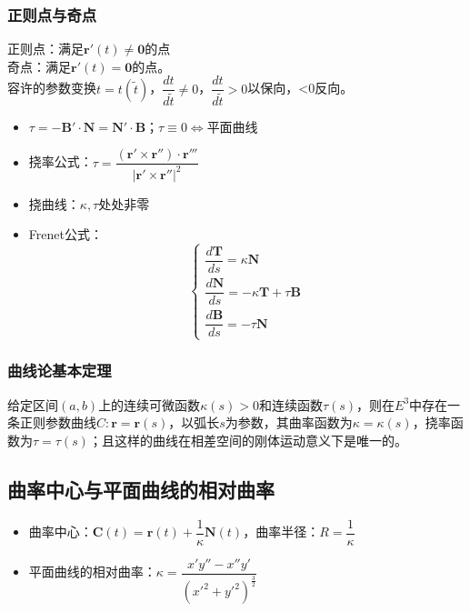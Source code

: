 \documentclass{article}
\begin{document}
	\subsubsection{正则点与奇点}
	正则点：满足$\boldsymbol{r}'(t)\neq\boldsymbol{0}$的点\\奇点：满足$\boldsymbol{r}'(t)=\boldsymbol{0}$的点。\\容许的参数变换$t=t(\tilde{t})$，$\dfrac{dt}{d\tilde{t}}\neq0$，$\dfrac{dt}{d\tilde{t}}>0$以保向，<0反向。
	\begin{itemize}
		\item $\tau=-\boldsymbol{B}'\cdot\boldsymbol{N}=\boldsymbol{N}'\cdot\boldsymbol{B}$；$\tau\equiv0\iff$平面曲线
		\item 挠率公式：$\tau=\dfrac{(\boldsymbol{r}'\times\boldsymbol{r}'')\cdot\boldsymbol{r}'''}{|\boldsymbol{r}'\times\boldsymbol{r}''|^2}$
		\item 挠曲线：$\kappa,\tau$处处非零
		\item Frenet公式：
		\[
		\begin{cases}
			\dfrac{d\boldsymbol{T}}{ds}=\kappa\boldsymbol{N}\\
			\dfrac{d\boldsymbol{N}}{ds}=-\kappa\boldsymbol{T}+\tau\boldsymbol{B}\\
			\dfrac{d\boldsymbol{B}}{ds}=-\tau\boldsymbol{N}
		\end{cases}
		\]
	\end{itemize}
	
	\subsubsection{曲线论基本定理}
	给定区间$(a,b)$上的连续可微函数$\kappa(s)>0$和连续函数$\tau(s)$，则在$E^3$中存在一条正则参数曲线$C:\boldsymbol{r}=\boldsymbol{r}(s)$，以弧长$s$为参数，其曲率函数为$\kappa=\kappa(s)$，挠率函数为$\tau=\tau(s)$；且这样的曲线在相差空间的刚体运动意义下是唯一的。
	
	\subsection{曲率中心与平面曲线的相对曲率}
	\begin{itemize}
		\item 曲率中心：$\boldsymbol{C}(t)=\boldsymbol{r}(t)+\dfrac{1}{\kappa}\boldsymbol{N}(t)$，曲率半径：$R=\dfrac{1}{\kappa}$
		\item 平面曲线的相对曲率：$\kappa=\dfrac{x'y''-x''y'}{(x'^2+y'^2)^{\frac{3}{2}}}$
	\end{itemize}
	
\end{document}
